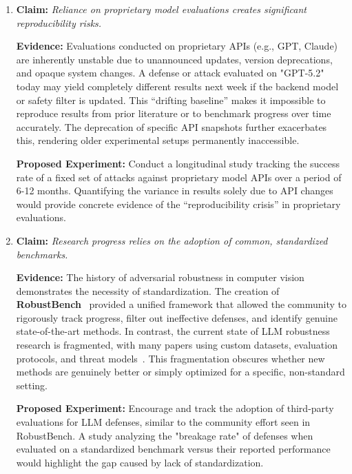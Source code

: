 \begin{enumerate}
    \textbf{Proposed Experiment:} 
    Extend existing studies to systematically investigate differences in false positive/negative rates of various judges specifically across different defense and attack algorithms. Quantifying how much the choice of judge alters the \textit{ranking} of defenses would demonstrate the severity of this issue.

    \item \textbf{Claim:} \textit{Reliance on proprietary model evaluations creates significant reproducibility risks.}
    
    \textbf{Evidence:} 
    Evaluations conducted on proprietary APIs (e.g., GPT, Claude) are inherently unstable due to unannounced updates, version deprecations, and opaque system changes. A defense or attack evaluated on "GPT-5.2" today may yield completely different results next week if the backend model or safety filter is updated. This \enquote{drifting baseline} makes it impossible to reproduce results from prior literature or to benchmark progress over time accurately. The deprecation of specific API snapshots further exacerbates this, rendering older experimental setups permanently inaccessible.
    
    \textbf{Proposed Experiment:} 
    Conduct a longitudinal study tracking the success rate of a fixed set of attacks against proprietary model APIs over a period of 6-12 months. Quantifying the variance in results solely due to API changes would provide concrete evidence of the \enquote{reproducibility crisis} in proprietary evaluations.

    \item \textbf{Claim:} \textit{Research progress relies on the adoption of common, standardized benchmarks.}
    
    \textbf{Evidence:} 
    The history of adversarial robustness in computer vision demonstrates the necessity of standardization. The creation of \textbf{RobustBench}~\cite{croce2020robustbench} provided a unified framework that allowed the community to rigorously track progress, filter out ineffective defenses, and identify genuine state-of-the-art methods. In contrast, the current state of LLM robustness research is fragmented, with many papers using custom datasets, evaluation protocols, and threat models~\cite{beyer2025llm}. This fragmentation obscures whether new methods are genuinely better or simply optimized for a specific, non-standard setting.
    
    \textbf{Proposed Experiment:} 
    Encourage and track the adoption of third-party evaluations for LLM defenses, similar to the community effort seen in RobustBench. A study analyzing the "breakage rate" of defenses when evaluated on a standardized benchmark versus their reported performance would highlight the gap caused by lack of standardization.


\end{enumerate}
